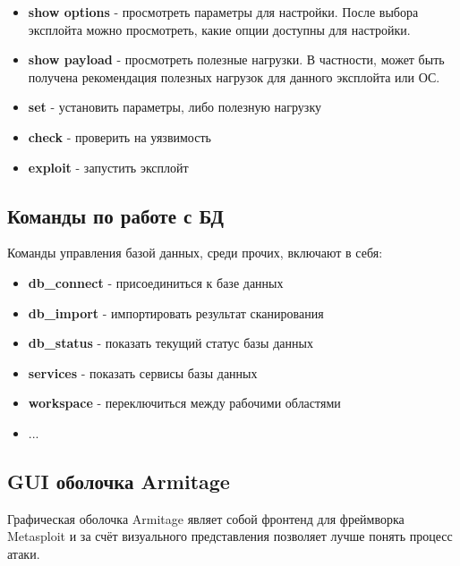 \documentclass[a4paper]{article}
\begin{document}
\begin{itemize}
\item \textbf{show options} - просмотреть параметры для настройки. После выбора эксплойта можно просмотреть, какие опции доступны для настройки.

\item \textbf{show payload} - просмотреть полезные нагрузки. В частности, может быть получена рекомендация полезных нагрузок для данного эксплойта или ОС.

\item \textbf{set} - установить параметры, либо полезную нагрузку

\item \textbf{check} - проверить на уязвимость

\item \textbf{exploit} - запустить эксплойт

\end{itemize}

\subsection{Команды по работе с БД}

Команды управления базой данных, среди прочих, включают в себя:

\begin{itemize}

\item \textbf{db\_connect} - присоединиться к базе данных

\item \textbf{db\_import} - импортировать результат сканирования

\item \textbf{db\_status} - показать текущий статус базы данных

\item \textbf{services} - показать сервисы базы данных

\item \textbf{workspace} - переключиться между рабочими областями

\item ...

\end{itemize}

\subsection{GUI оболочка Armitage}

Графическая оболочка Armitage являет собой фронтенд для фреймворка Metasploit и за счёт визуального представления позволяет лучше понять процесс атаки.
\end{document}
